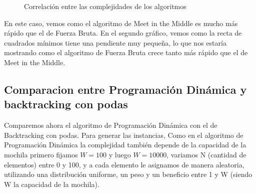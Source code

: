 \begin{figure}[H]
\begin{minipage}{0.5\textwidth}
     \caption{Correlación entre las complejidades de los algoritmos}
   \end{minipage}
\end{figure}

En este caso, vemos como el algoritmo de Meet in the Middle es mucho más rápido que el de Fuerza Bruta. En el segundo gráfico, vemos como la recta de cuadrados mínimos tiene una pendiente muy pequeña, lo que nos estaría mostrando como el algoritmo de Fuerza Bruta crece tanto más rápido que el de Meet in the Middle.

\subsection{Comparacion entre Programación Dinámica y backtracking con podas}
Comparemos ahora el algoritmo de Programación Dinámica con el de Backtracking con podas. Para generar las instancias, Como en el algoritmo de Programación Dinámica la complejidad también depende de la capacidad de la mochila primero fijamos $W = 100$ y luego $W = 10000$, variamos N (cantidad de elementos) entre 0 y 100, y a cada elemento le asignamos de manera aleatoria, utilizando una distribución uniforme, un peso y un beneficio entre 1 y W (siendo W la capacidad de la mochila). 
